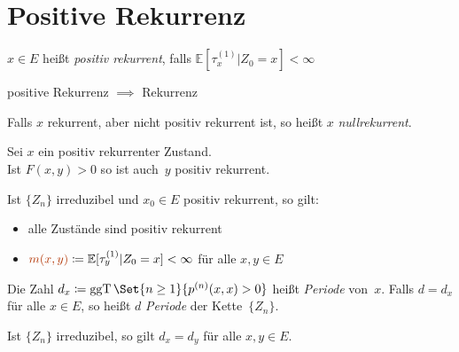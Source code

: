 \documentclass{cheat-sheet}
\newcommand{\E}{\mathbb{E}} %
\DeclareMathOperator{\ggT}{ggT} %
\newcommand{\Defn}[1]{\textcolor{DefinitionColor}{#1}}
\begin{document}

\section{Positive Rekurrenz}

\begin{defn}
  $x \in E$ heißt \emph{positiv rekurrent}, falls $\E [\tau_x^{(1)} | Z_0=x] < \infty$
\end{defn}

\begin{bem}
  positive Rekurrenz $\implies$ Rekurrenz
\end{bem}

\begin{defn}
  Falls $x$ rekurrent, aber nicht positiv rekurrent ist, so heißt $x$ \emph{nullrekurrent}.
\end{defn}

\begin{lem}
  \begin{minipage}[t]{0.8 \linewidth}
    Sei $x$ ein positiv rekurrenter Zustand. \\
    Ist $F(x, y) > 0$ so ist auch~$y$ positiv rekurrent.
  \end{minipage}
\end{lem}

\begin{kor}
  Ist $\{ Z_n \}$ irreduzibel und $x_0 \in E$ positiv rekurrent, so gilt:
  \begin{itemize}
    \item alle Zustände sind positiv rekurrent
    \item $\Defn{m(x, y)} \coloneqq \E[ \tau^{(1)}_y | Z_0 = x ] < \infty$ für alle $x, y \in E$
  \end{itemize}
\end{kor}

\begin{defn}
  Die Zahl
  $d_x \coloneqq \ggT \Set{n \geq 1}{p^{(n)}(x,x) > 0}$
  heißt \emph{Periode} von~$x$.
  Falls $d = d_x$ für alle $x \in E$, so heißt $d$ \textit{Periode} der Kette~$\{ Z_n \}$.
\end{defn}

\begin{lem}
  Ist $\{ Z_n \}$ irreduzibel, so gilt $d_x = d_y$ für alle $x, y \in E$.
\end{lem}
\end{document}
